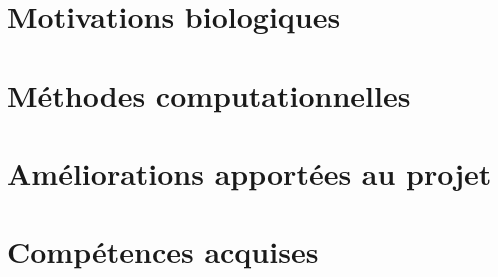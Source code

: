 
\author{
{\FirstNameA\ \AuthorA\ } 
{\FirstNameB\ \AuthorB\ }
}

\institute{
{\InstituteA }
{\InstituteB }
}           

\conference{\Conference}
 
\maketitle

\begin{multicols}{4}

\section{Motivations biologiques}
\ParagMotivBio
\columnbreak

\section{Méthodes computationnelles}
\ParagMethComp
\columnbreak

\section{Améliorations apportées au projet}
\ParagAmelio
\columnbreak

\section{Compétences acquises}
\ParagCompAcqu

\end{multicols}

